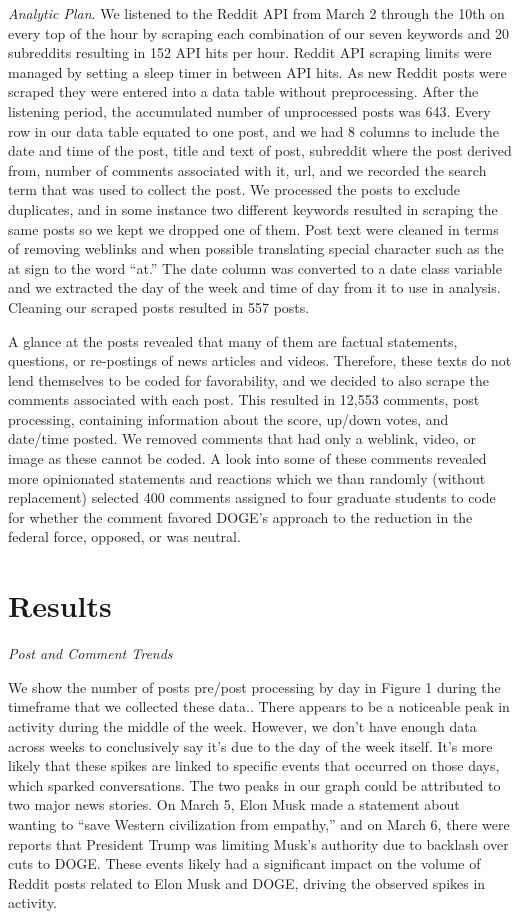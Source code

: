 \documentclass[
  12pt]{article}
\begin{document}
\emph{Analytic Plan}. We listened to the Reddit API from March 2 through
the 10th on every top of the hour by scraping each combination of our
seven keywords and 20 subreddits resulting in 152 API hits per hour.
Reddit API scraping limits were managed by setting a sleep timer in
between API hits. As new Reddit posts were scraped they were entered
into a data table without preprocessing. After the listening period, the
accumulated number of unprocessed posts was 643. Every row in our data
table equated to one post, and we had 8 columns to include the date and
time of the post, title and text of post, subreddit where the post
derived from, number of comments associated with it, url, and we
recorded the search term that was used to collect the post. We processed
the posts to exclude duplicates, and in some instance two different
keywords resulted in scraping the same posts so we kept we dropped one
of them. Post text were cleaned in terms of removing weblinks and when
possible translating special character such as the at sign to the word
``at.'' The date column was converted to a date class variable and we
extracted the day of the week and time of day from it to use in
analysis. Cleaning our scraped posts resulted in 557 posts.

A glance at the posts revealed that many of them are factual statements,
questions, or re-postings of news articles and videos. Therefore, these
texts do not lend themselves to be coded for favorability, and we
decided to also scrape the comments associated with each post. This
resulted in 12,553 comments, post processing, containing information
about the score, up/down votes, and date/time posted. We removed
comments that had only a weblink, video, or image as these cannot be
coded. A look into some of these comments revealed more opinionated
statements and reactions which we than randomly (without replacement)
selected 400 comments assigned to four graduate students to code for
whether the comment favored DOGE's approach to the reduction in the
federal force, opposed, or was neutral.

\section{Results}\label{results}

\emph{Post and Comment Trends}

We show the number of posts pre/post processing by day in Figure 1
during the timeframe that we collected these data.. There appears to be
a noticeable peak in activity during the middle of the week. However, we
don't have enough data across weeks to conclusively say it's due to the
day of the week itself. It's more likely that these spikes are linked to
specific events that occurred on those days, which sparked
conversations. The two peaks in our graph could be attributed to two
major news stories. On March 5, Elon Musk made a statement about wanting
to ``save Western civilization from empathy,'' and on March 6, there
were reports that President Trump was limiting Musk's authority due to
backlash over cuts to DOGE. These events likely had a significant impact
on the volume of Reddit posts related to Elon Musk and DOGE, driving the
observed spikes in activity.
\end{document}
